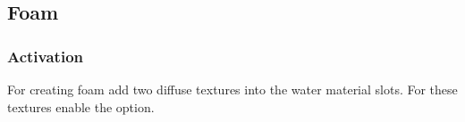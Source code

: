 \documentclass[a4paper,12pt,oneside]{sphinxmanual}
\begin{document}
\subsection{Foam}
\label{outdoor_rendering:id11}

\subsubsection{Activation}
\label{outdoor_rendering:id12}
For creating foam add two diffuse textures into the water material slots. For these textures enable the  option.
\begin{figure}[htbp]
\centering

\end{figure}
\end{document}
